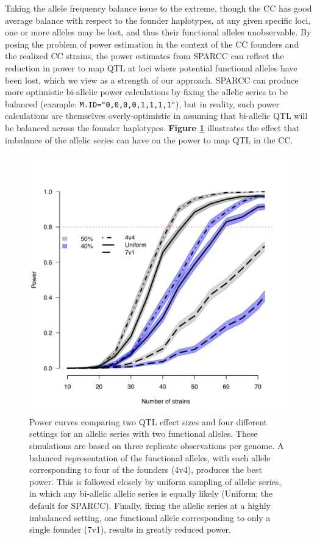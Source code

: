 Taking the allele frequency balance issue to the extreme, though the CC has good average balance with respect to the founder haplotypes, at any given specific loci, one or more alleles may be lost, and thus their functional alleles unobservable. By posing the problem of power estimation in the context of the CC founders and the realized CC strains, the power estimates from SPARCC can reflect the reduction in power to map QTL at loci where potential functional alleles have been lost, which we view as a strength of our approach. SPARCC can produce more optimistic bi-allelic power calculations by fixing the allelic series to be balanced (example: \texttt{M.ID="0,0,0,0,1,1,1,1"}), but in reality, such power calculations are themselves overly-optimistic in assuming that bi-allelic QTL will be balanced across the founder haplotypes. \textbf{Figure \ref{fig:two_alleles}} illustrates the effect that imbalance of the allelic series can have on the power to map QTL in the CC.

\begin{figure}
\renewcommand{\familydefault}{\sfdefault}\normalfont
\centering
\includegraphics[width=\textwidth, trim={0in 0.2in 0in 0in}, clip]{figures/3-sparcc/two_allele_comparisons_processed.pdf}
\caption[Comparison of power curves for varying allelic series with two functional alleles]{Power curves comparing two QTL effect sizes and four different settings for an allelic series with two functional alleles. These simulations are based on three replicate observations per genome. A balanced representation of the functional alleles, with each allele corresponding to four of the founders (4v4), produces the best power. This is followed closely by uniform sampling of allelic series, in which any bi-allelic allelic series is equally likely (Uniform; the default for SPARCC). Finally, fixing the allelic series at a highly imbalanced setting, one functional allele corresponding to only a single founder (7v1), results in greatly reduced power.\label{fig:two_alleles}}
\end{figure}

